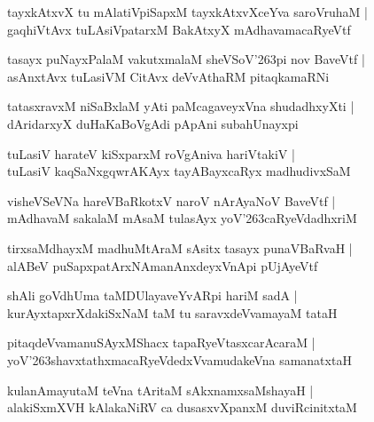 \documentclass[twoside,12pt,openright]{book}
\def\S{\char'263}
\newcounter{shloka}[chapter]
\begin{document}
\begin{shloka}%
tayxkAtxvX tu mAlatiVpiSapxM tayxkAtxvXceYva saroVruhaM |\\
gaqhiVtAvx tuLAsiVpatarxM BakAtxyX mAdhavamacaRyeVtf
\end{shloka}

\begin{shloka}%
tasayx puNayxPalaM vakutxmalaM sheVSoV\S pi nov BaveVtf |\\
asAnxtAvx tuLasiVM CitAvx deVvAthaRM pitaqkamaRNi
\end{shloka}

\begin{shloka}%
tatasxravxM niSaBxlaM yAti paMcagaveyxVna shudadhxyXti |\\
dAridarxyX duHaKaBoVgAdi pApAni subahUnayxpi
\end{shloka}

\begin{shloka}%
tuLasiV harateV kiSxparxM roVgAniva hariVtakiV |\\
tuLasiV kaqSaNxgqwrAKAyx tayABayxcaRyx madhudivxSaM 
\end{shloka}

\begin{shloka}%
visheVSeVNa hareVBaRkotxV naroV nArAyaNoV BaveVtf |\\
mAdhavaM sakalaM mAsaM tulasAyx yoV\S caRyeVdadhxriM 
\end{shloka}

\begin{shloka}%
tirxsaMdhayxM madhuMtAraM sAsitx tasayx punaVBaRvaH |\\
alABeV puSapxpatArxNAmanAnxdeyxVnApi pUjAyeVtf
\end{shloka}

\begin{shloka}%
shAli goVdhUma taMDUlayaveYvARpi hariM sadA |\\
kurAyxtapxrXdakiSxNaM taM tu saravxdeVvamayaM tataH 
\end{shloka}

\begin{shloka}%
pitaqdeVvamanuSAyxMShacx tapaRyeVtasxcarAcaraM |\\
yoV\S shavxtathxmacaRyeVdedxVvamudakeVna samanatxtaH 
\end{shloka}

\begin{shloka}%
kulanAmayutaM teVna tAritaM sAkxnamxsaMshayaH |\\
alakiSxmXVH kAlakaNiRV ca dusasxvXpanxM duviRcinitxtaM
\end{shloka}
\end{document}
